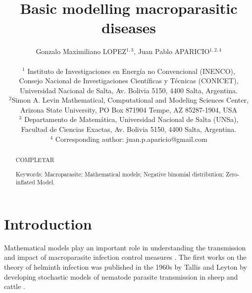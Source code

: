 \documentclass[12pt,a4paper]{article}
\title{Basic modelling macroparasitic diseases}
\author{Gonzalo Maximiliano LOPEZ$^{1,3}$, Juan Pablo APARICIO$^{1,2,4}$\\
	\\
	{\small $^1$ Instituto de Investigaciones en Energ\'ia no Convencional (INENCO),} \\ {\small Consejo Nacional de Investigaciones Cient\'ificas y T\'ecnicas (CONICET),}\\
	{\small Universidad Nacional de Salta, Av. Bolivia 5150, 4400 Salta, Argentina.}\\
	$^2${\small Simon A. Levin Mathematical, Computational and Modeling Sciences Center,} \\ {\small Arizona State University, PO Box 871904 Tempe, AZ 85287-1904, USA}\\
	{\small $^3$ Departamento de Matem\'atica, Universidad Nacional de Salta (UNSa),}\\{\small Facultad de Ciencias Exactas, Av. Bolivia 5150, 4400 Salta, Argentina.}\\
	{\small $^4$ Corresponding author: juan.p.aparicio@gmail.com}}
\date{}
\theoremstyle{plain}%
\theoremstyle{definition}
\theoremstyle{remark}
\begin{document}
\maketitle
\begin{abstract}
	
	COMPLETAR
	
	Keywords: Macroparasite; Mathematical models; Negative binomial distribution; Zero-inflated Model.
\end{abstract}
\tableofcontents
\tableofcontents
\section{Introduction}
% 	
 	
 	Mathematical models play an important role in understanding the transmission and impact of macroparasite infection control measures \cite{anderson1992infectious,anderson2014coverage,truscott2016soil}.
	The first works on the theory of helminth infection was published in the 1960s by Tallis and Leyton by developing stochastic models of nematode parasite transmission in sheep and cattle \cite{leyton1968stochastic,tallis1966stochastic,tallis1969stochastic}.
 	
\end{document}
